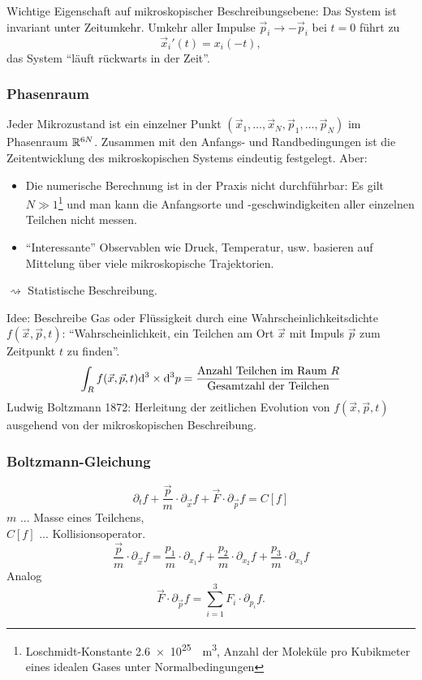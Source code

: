 Wichtige Eigenschaft auf mikroskopischer Beschreibungsebene: Das System ist
invariant unter Zeitumkehr. Umkehr aller Impulse $\vec{p}_i \to - \vec{p}_i$ bei
$t=0$ führt zu
\[ \vec{x}_i'(t) = x_i(-t), \]
das System ``läuft rückwarts in der Zeit''.

\subsubsection*{Phasenraum}
Jeder Mikrozustand ist ein einzelner Punkt $(\vec{x}_1, \ldots, \vec{x}_N,
\vec{p}_1, \ldots, \vec{p}_N)$ im Phasenraum $\mathbb{R}^{6N}$. Zusammen mit den
Anfangs- und Randbedingungen ist die Zeitentwicklung des mikroskopischen Systems
eindeutig festgelegt. Aber:
\begin{itemize}
\item Die numerische Berechnung ist in der Praxis nicht durchführbar: Es gilt $N
  \gg 1$\footnote{%
    Loschmidt-Konstante \SI{2.6e25}{\per \m \cubed}, Anzahl der Moleküle pro
    Kubikmeter eines idealen Gases unter Normalbedingungen}
  und man kann die Anfangsorte und -geschwindigkeiten aller einzelnen Teilchen
  nicht messen.
\item ``Interessante'' Observablen wie Druck, Temperatur, usw. basieren auf
  Mittelung über viele mikroskopische Trajektorien.
\end{itemize}
$\rightsquigarrow$ Statistische Beschreibung.

Idee: Beschreibe Gas oder Flüssigkeit durch eine Wahrscheinlichkeitsdichte
$f(\vec{x}, \vec{p}, t)$: ``Wahrscheinlichkeit, ein Teilchen am Ort $\vec{x}$
mit Impuls $\vec{p}$ zum Zeitpunkt $t$ zu finden''.
\[ \int_R f(\vec{x}, \vec{p}, t) \mathrm{d}^3 \times \mathrm{d}^3 p =
  \frac{\text{Anzahl Teilchen im Raum $R$}}{\text{Gesamtzahl der Teilchen}} \]
Ludwig Boltzmann 1872: Herleitung der zeitlichen Evolution von $f(\vec{x},
\vec{p}, t)$ ausgehend von der mikroskopischen Beschreibung.

\subsubsection*{Boltzmann-Gleichung}
\[ \partial_t f + \frac{\vec{p}}{m} \cdot \partial_{\vec{x}} f + \vec{F} \cdot
  \partial_{\vec{p}} f = C[f] \]
$m$ ... Masse eines Teilchens, \\
$C[f]$ ... Kollisionsoperator.
\[ \frac{\vec{p}}{m} \cdot \partial_{\vec{x}} f =
  \frac{p_1}{m} \cdot \partial_{x_1} f +
  \frac{p_2}{m} \cdot \partial_{x_2} f +
  \frac{p_3}{m} \cdot \partial_{x_3} f \]
Analog
\[ \vec{F} \cdot \partial_{\vec{p}} f = \sum_{i=1}^3 F_i \cdot \partial_{p_i}
  f. \]

